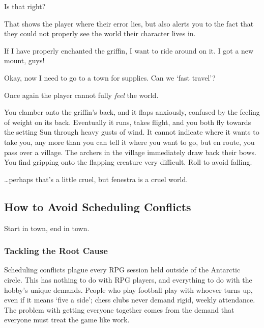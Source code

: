 \begin{multicols}{2}
\begin{speechtext}
  Is that right?
\end{speechtext}

That shows the player where their error lies, but also alerts you to the fact that they could not properly see the world their character lives in.

\begin{boxtext}
  If I have properly enchanted the griffin, I want to ride around on it.
  I got a new mount, guys!

  Okay, now I need to go to a town for supplies.
  Can we `fast travel'?
\end{boxtext}

Once again the player cannot fully \emph{feel} the world.

\begin{speechtext}
  You clamber onto the griffin's back, and it flaps anxiously, confused by the feeling of weight on its back.
  Eventually it runs, takes flight, and you both fly towards the setting Sun through heavy gusts of wind.
  It cannot indicate where it wants to take you, any more than you can tell it where you want to go, but en route, you pass over a \gls{village}.
  The archers in the \gls{village} immediately draw back their bows.
  You find gripping onto the flapping creature very difficult.
  Roll  to avoid falling.
  
\end{speechtext}

\noindent
\ldots perhaps that's a little cruel, but \gls{fenestra} is a cruel world.

\subsection{How to Avoid Scheduling Conflicts}

Start in town, end in town.

\subsubsection{Tackling the Root Cause}

Scheduling conflicts plague every RPG session held outside of the Antarctic circle.
This has nothing to do with RPG players, and everything to do with the hobby's unique demands.
People who play football play with whoever turns up, even if it means `five a side'; chess clubs never demand rigid, weekly attendance.
The problem with getting everyone together comes from the demand that everyone must treat the game like work.


\end{multicols}
